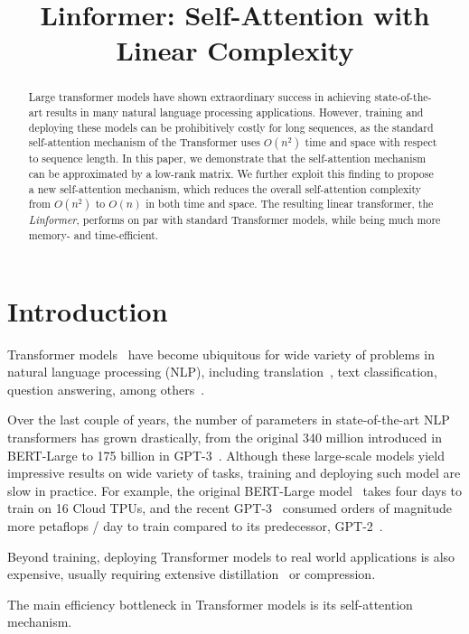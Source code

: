 \title{Linformer: Self-Attention with Linear Complexity}

\begin{abstract}
Large transformer models have shown extraordinary success in achieving state-of-the-art results in many natural language processing applications. However, training and deploying these models can be prohibitively costly for long sequences, as the standard self-attention mechanism of the Transformer uses $O(n^2)$ time and space with respect to sequence length. In this paper, we demonstrate that the self-attention mechanism can be approximated by a low-rank matrix. We further exploit this finding to propose a new self-attention mechanism, which reduces the overall self-attention complexity from $O(n^2)$ to $O(n)$ in both time and space. The resulting linear transformer, the \textit{Linformer}, performs on par with standard Transformer models, while being much more memory- and time-efficient.
\end{abstract}

\section{Introduction}

Transformer models~\citep{vaswani2017attention} have become ubiquitous for wide variety of problems in natural language processing (NLP), including translation~\citep{ott2018scaling}, text classification, question answering, among others~\citep{raffel2019exploring,mohamed2019transformers}.

Over the last couple of years, the number of parameters in state-of-the-art NLP transformers has grown drastically, from the original 340 million introduced in BERT-Large to 175 billion in GPT-3~\citep{brown2020language}. Although these large-scale models yield impressive results on wide variety of tasks, training and deploying such model are slow in practice. For example, the original BERT-Large model~\citep{devlin2019bert} takes four days to train on 16 Cloud TPUs, and the recent GPT-3~\citep{brown2020language} consumed orders of magnitude more petaflops / day to train compared to its predecessor, GPT-2~\citep{radford2019language}.

Beyond training, deploying Transformer models to real world applications is also expensive, usually requiring extensive distillation~\citep{hinton2015distilling} or compression.

The main efficiency bottleneck in Transformer models is its self-attention mechanism.

